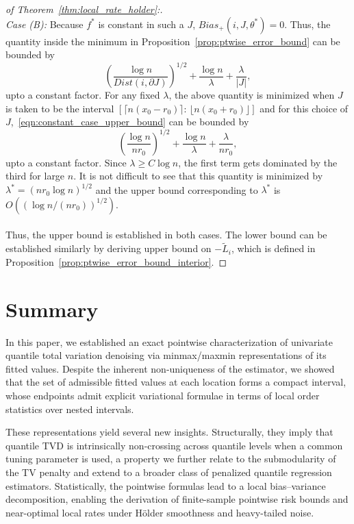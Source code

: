 \documentclass[11pt]{article}
\theoremstyle{plain}
\theoremstyle{definition}
\theoremstyle{remark}
\begin{document}
\begin{proof}[of Theorem~\ref{thm:local_rate_holder}:]
    \\
   \noindent \textit{Case (B):} Because $f^*$ is constant in such a $J$, $Bias_+(i,J,\theta^*)=0$.  Thus, the quantity inside the minimum in Proposition~\ref{prop:ptwise_error_bound} can be bounded by
\begin{equation}\label{eqn:constant_case_upper_bound}
    \left(\frac{\log n}{Dist(i,\partial J)}\right)^{1/2}+\frac{\log n}{\lambda}+\frac{\lambda}{|J|},
\end{equation}
    upto a constant factor.
    For any fixed $\lambda$, the above quantity is minimized when $J$ is taken to be the interval $[\lceil n(x_0-r_0)\rceil:\,\lfloor n(x_0+r_0)\rfloor]$ and for this choice of $J$,~\eqref{eqn:constant_case_upper_bound} can be bounded by
    \[\left(\frac{\log n}{nr_0}\right)^{1/2}+\frac{\log n}{\lambda}+\frac{\lambda}{nr_0},\]
    upto a constant factor. Since $\lambda \geq C \log n$, the first term gets dominated by the third for large $n$. It is not difficult to see that this quantity is minimized by $\lambda^*=(nr_0 \log n)^{1/2}$ and the upper bound corresponding to $\lambda^*$ is \(O\left((\log n /(nr_0))^{1/2}\right).\)\\
    \\
    \noindent  Thus, the upper bound is established in both cases. The lower bound can be established similarly by deriving upper bound on $-\tilde{L}_i$, which is defined in Proposition~\ref{prop:ptwise_error_bound_interior}.
\end{proof}



\section{Summary}\label{sec:conclusion}

In this paper, we established an exact pointwise characterization of univariate quantile total variation denoising via minmax/maxmin representations of its fitted values. Despite the inherent non-uniqueness of the estimator, we showed that the set of admissible fitted values at each location forms a compact interval, whose endpoints admit explicit variational formulae in terms of local order statistics over nested intervals.

These representations yield several new insights. Structurally, they imply that quantile TVD is intrinsically non-crossing across quantile levels when a common tuning parameter is used, a property we further relate to the submodularity of the TV penalty and extend to a broader class of penalized quantile regression estimators. Statistically, the pointwise formulas lead to a local bias--variance decomposition, enabling the derivation of finite-sample pointwise risk bounds and near-optimal local rates under H\"older smoothness and heavy-tailed noise.
\end{document}
